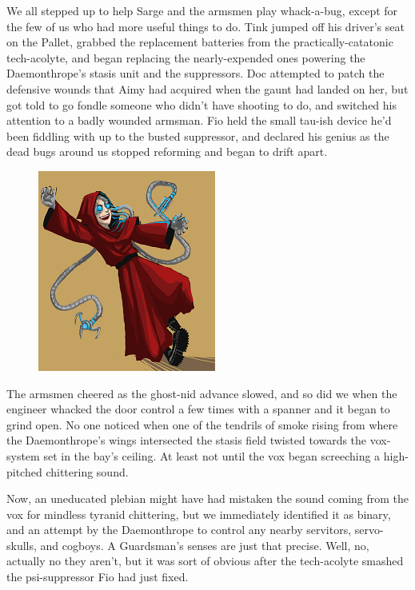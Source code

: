 We all stepped up to help Sarge and the armsmen play whack-a-bug, except for the few of us who had more useful things to do. 
Tink jumped off his driver's seat on the Pallet, grabbed the replacement batteries from the practically-catatonic tech-acolyte, and began replacing the nearly-expended ones powering the Daemonthrope's stasis unit and the suppressors. 
Doc attempted to patch the defensive wounds that Aimy had acquired when the gaunt had landed on her, but got told to go fondle someone who didn't have shooting to do, and switched his attention to a badly wounded armsman. 
Fio held the small tau-ish device he'd been fiddling with up to the busted suppressor, and declared his genius as the dead bugs around us stopped reforming and began to drift apart.

\begin{figure}
	\begin{center}
		\includegraphics[width=\figwidth]{pics/15/56.png}
	\end{center}
\end{figure}
The armsmen cheered as the ghost-nid advance slowed, and so did we when the engineer whacked the door control a few times with a spanner and it began to grind open. 
No one noticed when one of the tendrils of smoke rising from where the Daemonthrope's wings intersected the stasis field twisted towards the vox-system set in the bay's ceiling. 
At least not until the vox began screeching a high-pitched chittering sound.

Now, an uneducated plebian might have had mistaken the sound coming from the vox for mindless tyranid chittering, but we immediately identified it as binary, and an attempt by the Daemonthrope to control any nearby servitors, servo-skulls, and cogboys. 
A Guardsman's senses are just that precise. 
Well, no, actually no they aren't, but it was sort of obvious after the tech-acolyte smashed the psi-suppressor Fio had just fixed.

